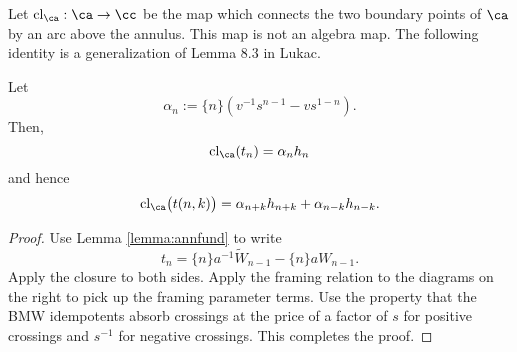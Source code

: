 Let $\textrm{cl}_\ca : \ca \to \cc$ be the map which connects the two boundary points of $\ca$ by an arc above the annulus. This map is not an algebra map. The following identity is a generalization of Lemma 8.3 in Lukac. 

\begin{lemma} \label{lemma:tclosure}
Let 
\[
\alpha_n := \{ n \} \left( v^{-1} s^{n - 1} - v s^{1 - n} \right).
\] 
Then, 
\[
\textrm{cl}_\ca (t_n) = \alpha_n h_n
\]
and hence 
\[
\textrm{cl}_\ca \big( t(n, k) \big) = \alpha_{n+k} h_{n+k} + \alpha_{n-k} h_{n-k}.
\]
\end{lemma}
\begin{proof}
Use Lemma \ref{lemma:annfund} to write 
\[
t_n = \{ n \} a^{-1}\widetilde{W}_{n - 1} - \{ n \} aW_{n - 1}.
\]
Apply the closure to both sides. Apply the framing relation to the diagrams on the right to pick up the framing parameter terms. Use the property that the BMW idempotents absorb crossings at the price of a factor of $s$ for positive crossings and $s^{-1}$ for negative crossings. This completes the proof. 
\end{proof}

